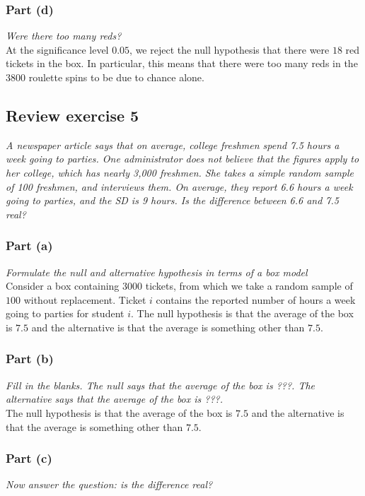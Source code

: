 \documentclass[11pt]{article}
\begin{document}
\subsubsection*{Part (d)}
\noindent \emph{Were there too many reds?}\\

\noindent At the significance level $0.05$, we reject the null hypothesis that there were $18$ red tickets in the box.  In particular, this means that there were too many reds in the $3800$ roulette spins to be due to chance alone.

\subsection*{Review exercise 5} %
\noindent \emph{A newspaper article says that on average, college freshmen spend 7.5 hours a week going to parties. One administrator does not believe that the figures apply to her college, which has nearly 3,000 freshmen. She takes a simple random sample of 100 freshmen, and interviews them. On average, they report 6.6 hours a week going to parties, and the SD is 9 hours. Is the difference between 6.6 and 7.5 real?}
\subsubsection*{Part (a)}
\noindent \emph{Formulate the null and alternative hypothesis in terms of a box model}\\

\noindent Consider a box containing $3000$ tickets, from which we take a random sample of $100$ without replacement.  Ticket $i$ contains the reported number of hours a week going to parties for student $i$.  The null hypothesis is that the average of the box is $7.5$ and the alternative is that the average is something other than $7.5$.\\

\subsubsection*{Part (b)}
\noindent \emph{Fill in the blanks. The null says that the average of the box is ???. The alternative says that the average of the box is ???.}\\

\noindent The null hypothesis is that the average of the box is $7.5$ and the alternative is that the average is something other than $7.5$.

\subsubsection*{Part (c)}
\noindent \emph{Now answer the question: is the difference real?}\\
\end{document}
